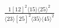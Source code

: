 \documentclass[varwidth, border=5pt]{standalone}
\begin{document}
\begin{my}
$\begin{gathered}
\scriptscriptstyle\frac{1[12]^2⟨15⟩⟨25⟩^2}{⟨23⟩[25]^2⟨35⟩⟨45⟩^2}
\end{gathered}$
\end{my}
\end{document}
